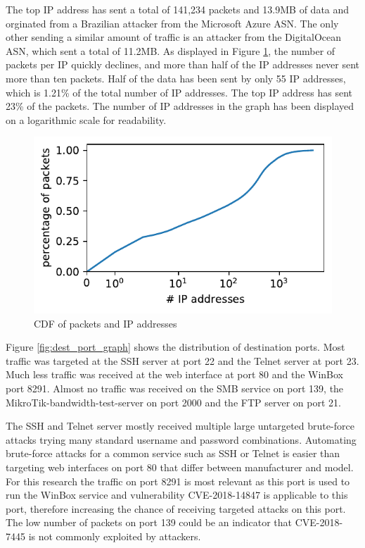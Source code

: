 The top IP address has sent a total of 141,234 packets and 13.9MB of data and orginated from a Brazilian attacker from the Microsoft Azure ASN. The only other sending a similar amount of traffic is an attacker from the DigitalOcean ASN, which sent a total of 11.2MB. As displayed in Figure \ref{fig:ip_packet_cdf}, the number of packets per IP quickly declines, and more than half of the IP addresses never sent more than ten packets. Half of the data has been sent by only 55 IP addresses, which is 1.21\% of the total number of IP addresses. The top IP address has sent 23\% of the packets. The number of IP addresses in the graph has been displayed on a logarithmic scale for readability. 

\begin{figure}[ht]
    \includegraphics[width=\linewidth]{images/ip_packet_cdf.pdf}
    \caption{CDF of packets and IP addresses}
    \label{fig:ip_packet_cdf}
\end{figure}

Figure \ref{fig:dest_port_graph} shows the distribution of destination ports. Most traffic was targeted at the SSH server at port 22 and the Telnet server at port 23. Much less traffic was received at the web interface at port 80 and the WinBox port 8291. Almost no traffic was received on the SMB service on port 139, the MikroTik-bandwidth-test-server on port 2000 and the FTP server on port 21.

The SSH and Telnet server mostly received multiple large untargeted brute-force attacks trying many standard username and password combinations. Automating brute-force attacks for a common service such as SSH or Telnet is easier than targeting web interfaces on port 80 that differ between manufacturer and model. For this research the traffic on port 8291 is most relevant as this port is used to run the WinBox service and vulnerability CVE-2018-14847 is applicable to this port, therefore increasing the chance of receiving targeted attacks on this port. The low number of packets on port 139 could be an indicator that CVE-2018-7445 is not commonly exploited by attackers.

